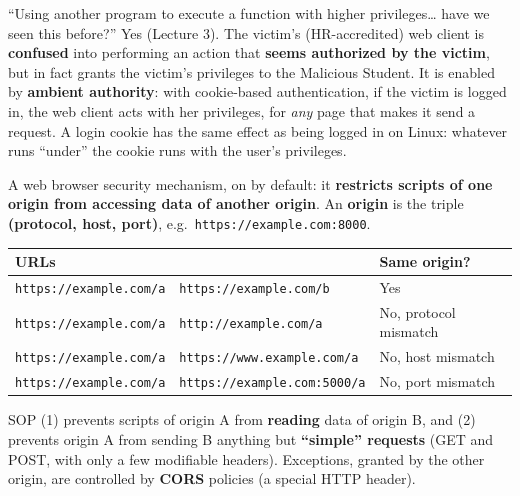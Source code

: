 \begin{keybox}[title={CSRF is an instance of the confused deputy problem}]
``Using another program to execute a function with higher privileges\ldots{} have we seen this
before?'' Yes (Lecture 3). The victim's (HR-accredited) web client is \textbf{confused} into
performing an action that \textbf{seems authorized by the victim}, but in fact grants the victim's
privileges to the Malicious Student. It is enabled by \textbf{ambient authority}: with cookie-based
authentication, if the victim is logged in, the web client acts with her privileges, for
\emph{any} page that makes it send a request. A login cookie has the same effect as being logged
in on Linux: whatever runs ``under'' the cookie runs with the user's privileges.
\end{keybox}

\begin{defnbox}[title={Same Origin Policy (SOP)}]
A web browser security mechanism, on by default: it \textbf{restricts scripts of one origin from
accessing data of another origin}. An \textbf{origin} is the triple \textbf{(protocol, host,
port)}, e.g.\ \texttt{https://example.com:8000}.
\begin{center}
\small
\begin{tabular}{l|l|l}
\multicolumn{2}{l|}{\textbf{URLs}} & \textbf{Same origin?} \\ \hline
\texttt{https://example.com/a} & \texttt{https://example.com/b} & Yes \\
\texttt{https://example.com/a} & \texttt{http://example.com/a} & No, protocol mismatch \\
\texttt{https://example.com/a} & \texttt{https://www.example.com/a} & No, host mismatch \\
\texttt{https://example.com/a} & \texttt{https://example.com:5000/a} & No, port mismatch
\end{tabular}
\end{center}
SOP (1) prevents scripts of origin A from \textbf{reading} data of origin B, and (2) prevents
origin A from sending B anything but \textbf{``simple'' requests} (GET and POST, with only a few
modifiable headers). Exceptions, granted by the other origin, are controlled by \textbf{CORS}
policies (a special HTTP header).
\end{defnbox}

